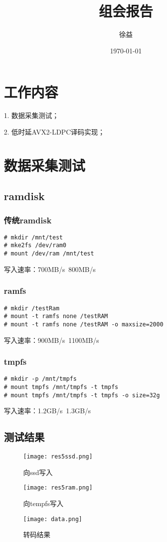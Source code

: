 \documentclass{article}
\title{组会报告}
\author{徐益}
\date{\today}
\begin{document}
\maketitle


\section{工作内容}
1. 数据采集测试；

2. 低时延AVX2-LDPC译码实现；


\section{数据采集测试}
\subsection{ramdisk}
\subsubsection{传统ramdisk}
\begin{lstlisting}
# mkdir /mnt/test
# mke2fs /dev/ram0
# mount /dev/ram /mnt/test
\end{lstlisting}
写入速率：700MB/s~800MB/s
\subsubsection{ramfs}
\begin{lstlisting}
# mkdir /testRam
# mount -t ramfs none /testRAM
# mount -t ramfs none /testRAM -o maxsize=2000
\end{lstlisting}
写入速率：900MB/s~1100MB/s
\subsubsection{tmpfs}
\begin{lstlisting}
# mkdir -p /mnt/tmpfs
# mount tmpfs /mnt/tmpfs -t tmpfs
# mount tmpfs /mnt/tmpfs -t tmpfs -o size=32g
\end{lstlisting}
写入速率：1.2GB/s~1.3GB/s

\subsection{测试结果}
\begin{figure}[H]
	\centering
	\texttt{[image: res5ssd.png]}
	\caption{向ssd写入}
\end{figure}
\begin{figure}[H]
	\centering
	\texttt{[image: res5ram.png]}
	\caption{向tempfs写入}
\end{figure}
\begin{figure}[H]
	\centering
	\texttt{[image: data.png]}
	\caption{转码结果}
\end{figure}
\end{document}
